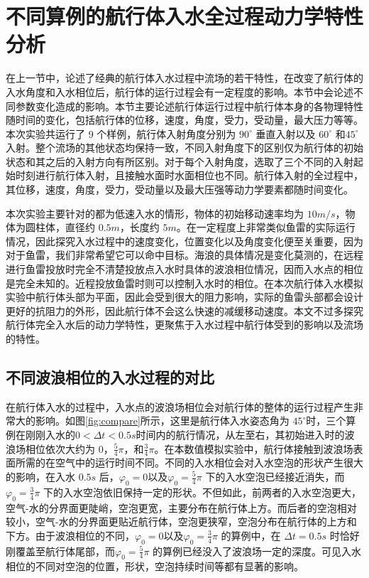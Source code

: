 

\section{不同算例的航行体入水全过程动力学特性分析}

在上一节中，论述了经典的航行体入水过程中流场的若干特性，在改变了航行体的入水角度和入水相位后，航行体的运行过程会有一定程度的影响。本节中会论述不同参数变化造成的影响。本节主要论述航行体运行过程中航行体本身的各物理特性随时间的变化，包括航行体的位移，速度，角度，受力，受动量，最大压力等等。本次实验共运行了 9 个样例，航行体入射角度分别为 $90 ^\circ$ 垂直入射以及 $60 ^\circ$ 和$45 ^\circ$入射。整个流场的其他状态均保持一致，不同入射角度下的区别仅为航行体的初始状态和其之后的入射方向有所区别。对于每个入射角度，选取了三个不同的入射起始时刻进行航行体入射，且接触水面时水面相位也不同。航行体入射的全过程中，其位移，速度，角度，受力，受动量以及最大压强等动力学要素都随时间变化。

本次实验主要针对的都为低速入水的情形，物体的初始移动速率均为 $10 m/s$，物体为圆柱体，直径约 $0.5 m$，长度约 $5 m$。在一定程度上非常类似鱼雷的实际运行情况，因此探究入水过程中的速度变化，位置变化以及角度变化便至关重要，因为对于鱼雷，我们非常希望它可以命中目标。海浪的具体情况是变化莫测的，在远程进行鱼雷投放时完全不清楚投放点入水时具体的波浪相位情况，因而入水点的相位是完全未知的。近程投放鱼雷时则可以控制入水时的相位。在本次航行体入水模拟实验中航行体头部为平面，因此会受到很大的阻力影响，实际的鱼雷头部都会设计更好的抗阻力的外形，因此航行体不会这么快速的减缓移动速度。本文不过多探究航行体完全入水后的动力学特性，更聚焦于入水过程中航行体受到的影响以及流场的特性。

\subsection{不同波浪相位的入水过程的对比}

在航行体入水的过程中，入水点的波浪场相位会对航行体的整体的运行过程产生非常大的影响。如图\ref{fig:compare}所示，这里是航行体入水姿态角为 $45 ^\circ$时，三个算例在刚刚入水的$0 < \Delta t < 0.5s$时间内的航行情况，从左至右，其初始进入时的波浪场相位依次大约为 $0$，$ \frac 5 4 \pi$，和$\frac 3 4 \pi$。在本数值模拟实验中，航行体接触到波浪场表面所需的在空气中的运行时间不同。不同的入水相位会对入水空泡的形状产生很大的影响，在入水 $0.5s$ 后，$\varphi_0 = 0$以及$\varphi_0 = \frac 5 4 \pi$ 下的入水空泡已经接近消失，而$\varphi_0 = \frac 3 4 \pi$ 下的入水空泡依旧保持一定的形状。不但如此，前两者的入水空泡更大，空气-水的分界面更陡峭，空泡更宽，主要分布在航行体上方。而后者的空泡相对较小，空气-水的分界面更贴近航行体，空泡更狭窄，空泡分布在航行体的上方和下方。由于波浪相位的不同，$\varphi_0 = 0$以及$\varphi_0 = \frac 3 4 \pi$ 的算例中，在 $\Delta t = 0.5s$ 时恰好刚覆盖至航行体尾部，而$\varphi_0 = \frac 5 4\pi$ 的算例已经没入了波浪场一定的深度。可见入水相位的不同对空泡的位置，形状，空泡持续时间等都有显著的影响。

